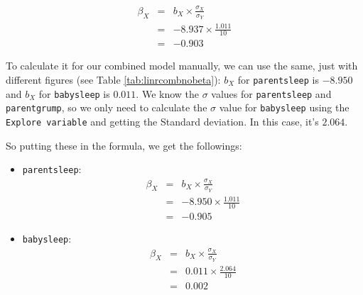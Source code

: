 \documentclass[
]{book}
\providecommand{\tightlist}{%
  \setlength{\itemsep}{0pt}\setlength{\parskip}{0pt}}
\theoremstyle{definition}
\theoremstyle{definition}
\theoremstyle{definition}
\theoremstyle{definition}
\theoremstyle{remark}
\begin{document}
\[
\begin{array}{rcl}
\beta_X &=& b_X \times \frac{\sigma_X}{\sigma_Y}
    \\
    &=& -8.937 \times \frac{1.011}{10}
    \\
    &=& -0.903
\end{array}
\]

To calculate it for our combined model manually, we can use the same, just with different figures (see Table \ref{tab:linrcombnobeta}): \(b_X\) for \texttt{parentsleep} is \(-8.950\) and \(b_X\) for \texttt{babysleep} is \(0.011\). We know the \(\sigma\) values for \texttt{parentsleep} and \texttt{parentgrump}, so we only need to calculate the \(\sigma\) value for \texttt{babysleep} using the \texttt{Explore\ variable} and getting the Standard deviation. In this case, it's \(2.064\).

So putting these in the formula, we get the followings:

\begin{itemize}
\tightlist
\item
  \texttt{parentsleep}:
  \[
  \begin{array}{rcl}
  \beta_X &=& b_X \times \frac{\sigma_X}{\sigma_Y}
    \\
    &=& -8.950 \times \frac{1.011}{10}
    \\
    &=& -0.905
  \end{array}
  \]
\item
  \texttt{babysleep}:
  \[
  \begin{array}{rcl}
  \beta_X &=& b_X \times \frac{\sigma_X}{\sigma_Y}
    \\
    &=& 0.011 \times \frac{2.064}{10}
    \\
    &=& 0.002
  \end{array}
  \]
\end{itemize}
\end{document}
